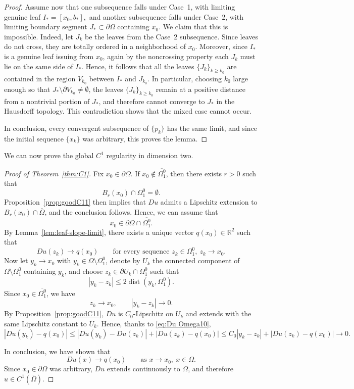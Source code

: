 \documentclass[reqno,11pt]{amsart}
\def\dist{{\mathop\mathrm{dist}}}
\numberwithin{equation}{section}
\theoremstyle{remark}
\begin{document}
\begin{proof}
Assume now that one subsequence falls under Case~1, with limiting genuine leaf
$I_*=[x_0,b_*],$
and another subsequence falls under Case~2, with limiting boundary segment
$J_*\subset\partial\Omega$
containing \(x_0\). We claim that this is impossible.
Indeed, let \(J_k\) be the leaves from the Case~2 subsequence. Since leaves do not cross,
they are totally ordered in a neighborhood of \(x_0\). 
Moreover, since \(I_*\) is a genuine leaf issuing from \(x_0\), again by the noncrossing
property each \(J_k\) must lie on the same side of \(I_*\). Hence, it follows that all the leaves \(\{J_k\}_{k \geq k_0}\) are contained in the region $V_{k_0}$ between \(I_*\) and \(J_{k_0}\).
In particular, choosing $k_0$ large enough so that $J_*\setminus \partial V_{k_0}\neq \emptyset$, the leaves \(\{J_k\}_{k \geq k_0}\) remain at a positive distance from a nontrivial portion of \(J_*\),
and therefore cannot converge to \(J_*\) in the Hausdorff topology.
This contradiction shows that the mixed case cannot occur.



In conclusion, every convergent subsequence of \(\{p_k\}\) has the same limit, and since the initial sequence \(\{x_k\}\) was arbitrary, this proves the lemma.
\end{proof}



We can now prove the global $C^1$ regularity in dimension two.


\begin{proof}[Proof of Theorem~\ref{thm:C1}]
Fix \(x_0\in\partial\Omega\).
If \(x_0\notin \overline{\Omega_1^0}\), then there exists \(r>0\) such that
\[
B_r(x_0)\cap\Omega_1^0=\emptyset.
\]
Proposition~\ref{prop:goodC11} then implies that \(Du\) admits a Lipschitz extension to \(B_r(x_0)\cap\overline\Omega\), and the conclusion follows.
Hence, we can assume that
\[
x_0\in \partial\Omega\cap \overline{\Omega_1^0}.
\]
By Lemma~\ref{lem:leaf-slope-limit}, there exists a unique vector
$q(x_0)\in\mathbb R^2$
such that
\begin{equation}\label{eq:Du Omega10}
Du(z_k)\to q(x_0)
\qquad\text{for every sequence }z_k\in \Omega_1^0,\ z_k\to x_0.
\end{equation}
Now let \(y_k\to x_0\) with \(y_k\in \Omega\setminus\Omega_1^0\), denote by \(U_k\)
the connected component of \(\Omega\setminus \Omega_1^0\) containing \(y_k\), and
choose
$z_k\in \partial U_k\cap\Omega_1^0$
such that
\[
|y_k-z_k|\leq 2\dist(y_k,\Omega_1^0).
\]
Since \(x_0\in \overline{\Omega_1^0}\), we have
\[
z_k\to x_0,
\qquad
|y_k-z_k|\to 0.
\]
By Proposition~\ref{prop:goodC11}, \(Du\) is \(C_0\)-Lipschitz on \(U_k\) and extends with the same Lipschitz constant to \(\overline U_k\). Hence, thanks to \eqref{eq:Du Omega10},
\[
|Du(y_k)-q(x_0)|
\le |Du(y_k)-Du(z_k)|+|Du(z_k)-q(x_0)|
\le C_0|y_k-z_k|+|Du(z_k)-q(x_0)|
\to 0.
\]

In conclusion, we have shown that
\[
Du(x)\to q(x_0)\qquad\text{as }x\to x_0,\ x\in\Omega.
\]
Since \(x_0\in\partial\Omega\) was arbitrary, \(Du\) extends continuously to \(\overline\Omega\), and therefore
$u\in C^1(\overline\Omega).$
\end{proof}
\end{document}
